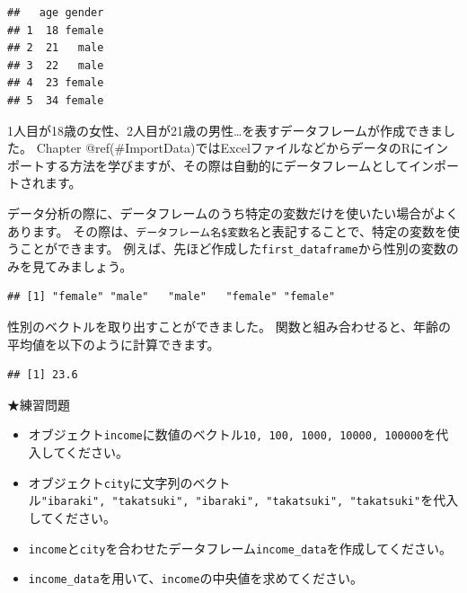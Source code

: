 \documentclass[
]{book}
\newenvironment{Shaded}{\begin{snugshade}}{\end{snugshade}}
\newcommand{\FunctionTok}[1]{\textcolor[rgb]{0.00,0.00,0.00}{#1}}
\newcommand{\NormalTok}[1]{#1}
\newcommand{\SpecialCharTok}[1]{\textcolor[rgb]{0.00,0.00,0.00}{#1}}
\providecommand{\tightlist}{%
  \setlength{\itemsep}{0pt}\setlength{\parskip}{0pt}}
\begin{document}
\begin{verbatim}
##   age gender
## 1  18 female
## 2  21   male
## 3  22   male
## 4  23 female
## 5  34 female
\end{verbatim}

1人目が18歳の女性、2人目が21歳の男性\ldots を表すデータフレームが作成できました。
Chapter @ref(\#ImportData)ではExcelファイルなどからデータのRにインポートする方法を学びますが、その際は自動的にデータフレームとしてインポートされます。

データ分析の際に、データフレームのうち特定の変数だけを使いたい場合がよくあります。
その際は、\texttt{データフレーム名\$変数名}と表記することで、特定の変数を使うことができます。
例えば、先ほど作成した\texttt{first\_dataframe}から性別の変数のみを見てみましょう。

\begin{Shaded}
\end{Shaded}

\begin{verbatim}
## [1] "female" "male"   "male"   "female" "female"
\end{verbatim}

性別のベクトルを取り出すことができました。
関数と組み合わせると、年齢の平均値を以下のように計算できます。

\begin{Shaded}
\end{Shaded}

\begin{verbatim}
## [1] 23.6
\end{verbatim}

★練習問題

\begin{itemize}
\tightlist
\item
  オブジェクト\texttt{income}に数値のベクトル\texttt{10,\ 100,\ 1000,\ 10000,\ 100000}を代入してください。
\item
  オブジェクト\texttt{city}に文字列のベクトル\texttt{"ibaraki",\ "takatsuki",\ "ibaraki",\ "takatsuki",\ "takatsuki"}を代入してください。
\item
  \texttt{income}と\texttt{city}を合わせたデータフレーム\texttt{income\_data}を作成してください。
\item
  \texttt{income\_data}を用いて、\texttt{income}の中央値を求めてください。
\end{itemize}
\end{document}
